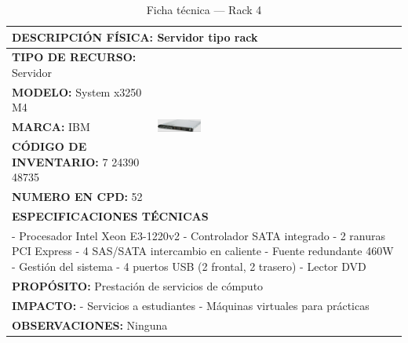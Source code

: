 \begin{table}[H]
\centering
\scriptsize
\setlength{\tabcolsep}{2pt}
\renewcommand{\arraystretch}{1.0}
\caption{Ficha técnica --- Rack 4}
\label{tab:rack-4}
\begin{tabular}{|p{}|p{}|}
\hline
\multicolumn{2}{|l|}{\textbf{DESCRIPCIÓN FÍSICA:} Servidor tipo rack} \\ \hline
\textbf{TIPO DE RECURSO:} Servidor & 
\multirow{5}{*}{\includegraphics[width=0.18\textwidth,keepaspectratio]{tablas-images/cp1/racks/rack-1.png}} \\ \cline{1-1}
\textbf{MODELO:} System x3250 M4 & \\ \cline{1-1}
\textbf{MARCA:} IBM & \\ \cline{1-1}
\textbf{CÓDIGO DE INVENTARIO:} 7 24390 48735 & \\ \cline{1-1}
\textbf{NUMERO EN CPD:} 52 & \\ \hline
\multicolumn{2}{|l|}{\textbf{ESPECIFICACIONES TÉCNICAS}} \\ \hline
\multicolumn{2}{|p{0.7\textwidth}|}{
- Procesador Intel Xeon E3-1220v2
- Controlador SATA integrado
- 2 ranuras PCI Express
- 4 SAS/SATA intercambio en caliente
- Fuente redundante 460W
- Gestión del sistema
- 4 puertos USB (2 frontal, 2 trasero)
- Lector DVD
} \\ \hline
\multicolumn{2}{|l|}{\textbf{PROPÓSITO:} Prestación de servicios de cómputo} \\ \hline
\multicolumn{2}{|p{0.7\textwidth}|}{\textbf{IMPACTO:} 
- Servicios a estudiantes
- Máquinas virtuales para prácticas} \\ \hline
\multicolumn{2}{|p{0.7\textwidth}|}{\textbf{OBSERVACIONES:} Ninguna} \\ \hline
\end{tabular}
\end{table}

